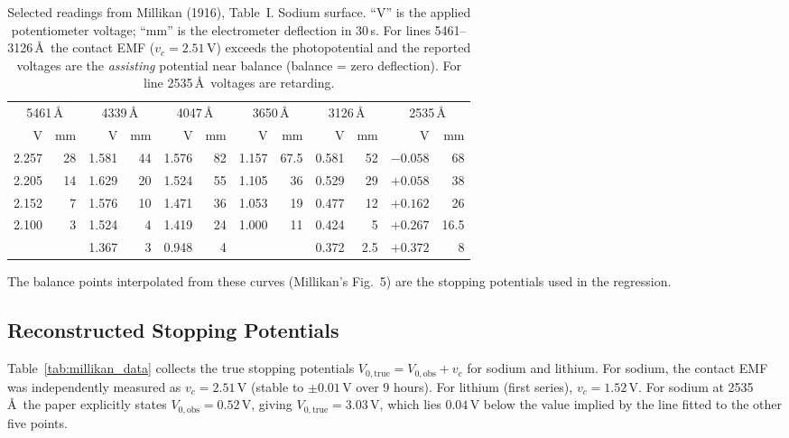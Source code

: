\documentclass[12pt]{article}
\begin{document}
\begin{table}[ht]
\centering
\caption{Selected readings from Millikan (1916), Table~I.
Sodium surface.  ``V'' is the applied potentiometer voltage;
``mm'' is the electrometer deflection in 30\,s.  For lines
5461--3126\,\AA\ the contact EMF ($v_c = 2.51$\,V) exceeds the
photopotential and the reported voltages are the \emph{assisting}
potential near balance (balance = zero deflection).
For line 2535\,\AA\ voltages are retarding.}
\label{tab:millikan_raw}
\begin{tabular}{rr|rr|rr|rr|rr|rr}
\toprule
\multicolumn{2}{c|}{5461\,\AA} &
\multicolumn{2}{c|}{4339\,\AA} &
\multicolumn{2}{c|}{4047\,\AA} &
\multicolumn{2}{c|}{3650\,\AA} &
\multicolumn{2}{c|}{3126\,\AA} &
\multicolumn{2}{c}{2535\,\AA} \\
V & mm & V & mm & V & mm & V & mm & V & mm & V & mm \\
\midrule
2.257 & 28  & 1.581 & 44  & 1.576 & 82   & 1.157 & 67.5 & 0.581 & 52   & $-0.058$ & 68   \\
2.205 & 14  & 1.629 & 20  & 1.524 & 55   & 1.105 & 36   & 0.529 & 29   & $+0.058$ & 38   \\
2.152 &  7  & 1.576 & 10  & 1.471 & 36   & 1.053 & 19   & 0.477 & 12   & $+0.162$ & 26   \\
2.100 &  3  & 1.524 &  4  & 1.419 & 24   & 1.000 & 11   & 0.424 &  5   & $+0.267$ & 16.5 \\
      &     & 1.367 &  3  & 0.948 &  4   &       &      & 0.372 &  2.5 & $+0.372$ &  8   \\
\bottomrule
\end{tabular}
\end{table}

\noindent The balance points interpolated from these curves (Millikan's
Fig.\ 5) are the stopping potentials used in the regression.

\subsection{Reconstructed Stopping Potentials}

Table~\ref{tab:millikan_data} collects the true stopping potentials
$V_{0,\mathrm{true}} = V_{0,\mathrm{obs}} + v_c$ for sodium and lithium.  For
sodium, the contact EMF was independently measured as $v_c = 2.51$\,V
(stable to $\pm 0.01$\,V over 9 hours).  For lithium (first series),
$v_c = 1.52$\,V.  For sodium at 2535\,\AA\ the paper explicitly states
$V_{0,\mathrm{obs}} = 0.52$\,V, giving $V_{0,\mathrm{true}} = 3.03$\,V,
which lies $0.04$\,V below the value implied by the line fitted to the
other five points.
\end{document}
